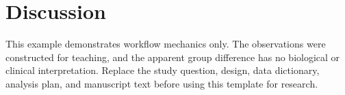 \section{Discussion}
This example demonstrates workflow mechanics only. The observations were
constructed for teaching, and the apparent group difference has no biological or
clinical interpretation. Replace the study question, design, data dictionary,
analysis plan, and manuscript text before using this template for research.

